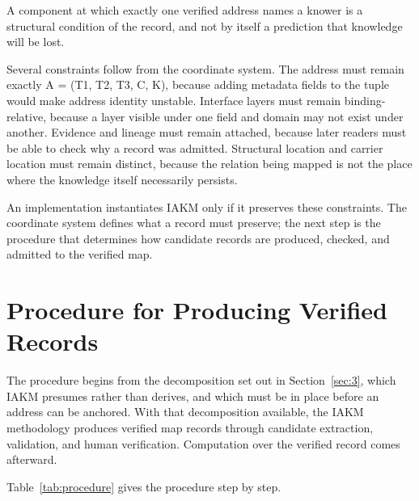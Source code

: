 \documentclass[conference]{IEEEtran}
\begin{document}
A component at which exactly one verified address names a knower is a structural condition of the record, and not by itself a prediction that knowledge will be lost.

Several constraints follow from the coordinate system. The address must remain exactly A = (T1, T2, T3, C, K), because adding metadata fields to the tuple would make address identity unstable. Interface layers must remain binding-relative, because a layer visible under one field and domain may not exist under another. Evidence and lineage must remain attached, because later readers must be able to check why a record was admitted. Structural location and carrier location must remain distinct, because the relation being mapped is not the place where the knowledge itself necessarily persists.

An implementation instantiates IAKM only if it preserves these constraints. The coordinate system defines what a record must preserve; the next step is the procedure that determines how candidate records are produced, checked, and admitted to the verified map.

\section{Procedure for Producing Verified Records}\label{sec:6}

The procedure begins from the decomposition set out in Section~\ref{sec:3}, which IAKM presumes rather than derives, and which must be in place before an address can be anchored. With that decomposition available, the IAKM methodology produces verified map records through candidate extraction, validation, and human verification. Computation over the verified record comes afterward.

Table~\ref{tab:procedure} gives the procedure step by step.
\end{document}
